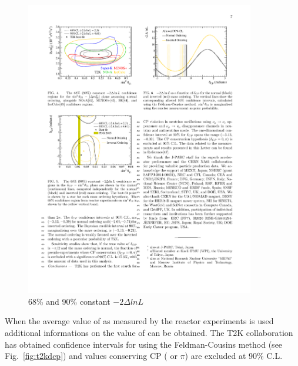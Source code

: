 \begin{figure} [htbp!]
\begin{center}
\includegraphics[width=10cm]{figures/t2k_joint_th13dcp.pdf}
\caption{\label{fig:t2kjoint} 68\% and 90\%  constant $-2\Delta ln L$}
\end{center}
\end{figure}


When the average value of \thint as measured by the reactor experiments is used additional informations on the value of \dcp can be obtained. The T2K collaboration has obtained confidence intervals for \dcp using the Feldman-Cousins method (see Fig.~\ref{fig:t2kdcp}) and values conserving CP ( or $\pi$) are excluded at 90\% C.L.

